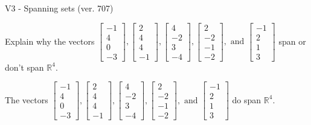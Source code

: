 \begin{exercise}
  \begin{exerciseTitle}V3 - Spanning sets (ver. 707)\end{exerciseTitle}
  \begin{exerciseStatement}
    Explain why the vectors \(\left[\begin{array}{r}
-1 \\
4 \\
0 \\
-3
\end{array}\right] , \left[\begin{array}{r}
2 \\
4 \\
4 \\
-1
\end{array}\right] , \left[\begin{array}{r}
4 \\
-2 \\
3 \\
-4
\end{array}\right] , \left[\begin{array}{r}
2 \\
-2 \\
-1 \\
-2
\end{array}\right] , \text{ and } \left[\begin{array}{r}
-1 \\
2 \\
1 \\
3
\end{array}\right]\) span or don't span \(\mathbb{R}^4\). 
	


  \end{exerciseStatement}
  \begin{exerciseAnswer}
   The vectors \(\left[\begin{array}{r}
-1 \\
4 \\
0 \\
-3
\end{array}\right] , \left[\begin{array}{r}
2 \\
4 \\
4 \\
-1
\end{array}\right] , \left[\begin{array}{r}
4 \\
-2 \\
3 \\
-4
\end{array}\right] , \left[\begin{array}{r}
2 \\
-2 \\
-1 \\
-2
\end{array}\right] , \text{ and } \left[\begin{array}{r}
-1 \\
2 \\
1 \\
3
\end{array}\right]\) 
  	 do  
	span \(\mathbb{R}^4\).
  



\end{exerciseAnswer}
\end{exercise}
